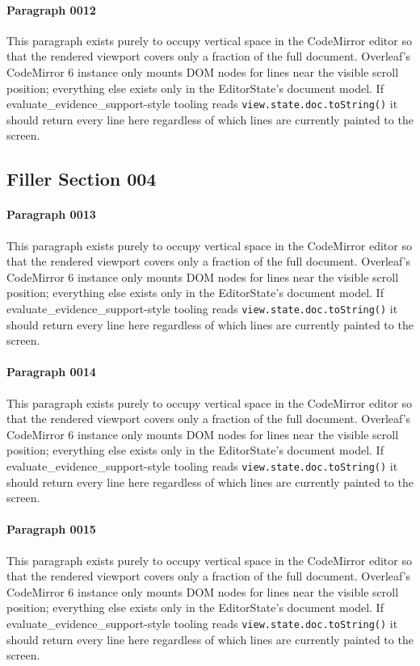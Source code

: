 \documentclass{article}
\begin{document}
\paragraph{Paragraph 0012}
This paragraph exists purely to occupy vertical space in the CodeMirror editor so that the rendered viewport covers only a fraction of the full document. Overleaf's CodeMirror 6 instance only mounts DOM nodes for lines near the visible scroll position; everything else exists only in the EditorState's document model. If evaluate\_evidence\_support-style tooling reads \texttt{view.state.doc.toString()} it should return every line here regardless of which lines are currently painted to the screen.

\subsection{Filler Section 004}
\paragraph{Paragraph 0013}
This paragraph exists purely to occupy vertical space in the CodeMirror editor so that the rendered viewport covers only a fraction of the full document. Overleaf's CodeMirror 6 instance only mounts DOM nodes for lines near the visible scroll position; everything else exists only in the EditorState's document model. If evaluate\_evidence\_support-style tooling reads \texttt{view.state.doc.toString()} it should return every line here regardless of which lines are currently painted to the screen.

\paragraph{Paragraph 0014}
This paragraph exists purely to occupy vertical space in the CodeMirror editor so that the rendered viewport covers only a fraction of the full document. Overleaf's CodeMirror 6 instance only mounts DOM nodes for lines near the visible scroll position; everything else exists only in the EditorState's document model. If evaluate\_evidence\_support-style tooling reads \texttt{view.state.doc.toString()} it should return every line here regardless of which lines are currently painted to the screen.

\paragraph{Paragraph 0015}
This paragraph exists purely to occupy vertical space in the CodeMirror editor so that the rendered viewport covers only a fraction of the full document. Overleaf's CodeMirror 6 instance only mounts DOM nodes for lines near the visible scroll position; everything else exists only in the EditorState's document model. If evaluate\_evidence\_support-style tooling reads \texttt{view.state.doc.toString()} it should return every line here regardless of which lines are currently painted to the screen.
\end{document}

